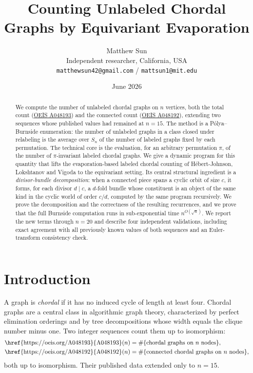 \documentclass[11pt]{article}
\title{\bf Counting Unlabeled Chordal Graphs by Equivariant Evaporation}
\author{Matthew Sun\\[2pt]\normalsize Independent researcher, California, USA\\\normalsize\texttt{matthewsun42@gmail.com} / \texttt{mattsun1@mit.edu}}
\date{June 2026}
\theoremstyle{plain}
\theoremstyle{definition}
\begin{document}
\maketitle

\begin{abstract}
We compute the number of unlabeled chordal graphs on $n$ vertices, both the total count
(\href{https://oeis.org/A048193}{OEIS A048193}) and the connected count
(\href{https://oeis.org/A048192}{OEIS A048192}), extending two sequences whose published values had
remained at $n=15$. The method is a P\'olya--Burnside enumeration: the number of unlabeled graphs in
a class closed under relabeling is the average over $S_n$ of the number of labeled graphs fixed by
each permutation. The technical core is the evaluation, for an arbitrary permutation $\pi$, of the
number of $\pi$-invariant labeled chordal graphs. We give a dynamic program for this quantity that
lifts the evaporation-based labeled chordal counting of H\'ebert-Johnson, Lokshtanov and Vigoda to
the equivariant setting. Its central structural ingredient is a \emph{divisor-bundle decomposition}:
when a connected piece spans a cyclic orbit of size $c$, it forms, for each divisor $d\mid c$, a
$d$-fold bundle whose constituent is an object of the same kind in the cyclic world of order $c/d$,
computed by the same program recursively. We prove the decomposition and the correctness of the
resulting recurrences, and we prove that the full Burnside computation runs in sub-exponential time
$n^{O(\sqrt n)}$. We report the new terms through $n=20$ and describe four independent validations,
including exact agreement with all previously known values of both sequences and an Euler-transform
consistency check.
\end{abstract}

\section{Introduction}

A graph is \emph{chordal} if it has no induced cycle of length at least four. Chordal graphs are a
central class in algorithmic graph theory, characterized by perfect elimination orderings and by
tree decompositions whose width equals the clique number minus one. Two integer sequences count them
up to isomorphism:
\begin{align*}
\text{\href{https://oeis.org/A048193}{A048193}}(n)&=\#\{\text{chordal graphs on }n\text{ nodes}\},\\
\text{\href{https://oeis.org/A048192}{A048192}}(n)&=\#\{\text{connected chordal graphs on }n\text{ nodes}\},
\end{align*}
both up to isomorphism. Their published data extended only to $n=15$.
\end{document}
